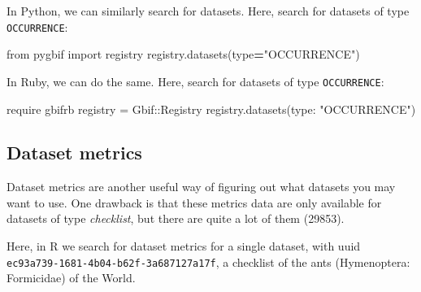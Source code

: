 \documentclass[3p]{elsarticle} %
\newenvironment{Shaded}{\begin{snugshade}}{\end{snugshade}}
\newcommand{\BuiltInTok}[1]{#1}
\newcommand{\DataTypeTok}[1]{\textcolor[rgb]{0.13,0.29,0.53}{#1}}
\newcommand{\ImportTok}[1]{#1}
\newcommand{\KeywordTok}[1]{\textcolor[rgb]{0.13,0.29,0.53}{\textbf{#1}}}
\newcommand{\NormalTok}[1]{#1}
\newcommand{\OperatorTok}[1]{\textcolor[rgb]{0.81,0.36,0.00}{\textbf{#1}}}
\newcommand{\StringTok}[1]{\textcolor[rgb]{0.31,0.60,0.02}{#1}}
\begin{document}
In Python, we can similarly search for datasets. Here, search for
datasets of type \texttt{OCCURRENCE}:

\begin{Shaded}
\begin{Highlighting}[]
\ImportTok{from}\NormalTok{ pygbif }\ImportTok{import}\NormalTok{ registry}
\NormalTok{registry.datasets(}\BuiltInTok{type}\OperatorTok{=}\StringTok{"OCCURRENCE"}\NormalTok{)}
\end{Highlighting}
\end{Shaded}

In Ruby, we can do the same. Here, search for datasets of type
\texttt{OCCURRENCE}:

\begin{Shaded}
\begin{Highlighting}[]
\NormalTok{require }\StringTok{\textquotesingle{}gbifrb\textquotesingle{}}
\NormalTok{registry = }\DataTypeTok{Gbif}\NormalTok{::}\DataTypeTok{Registry}
\NormalTok{registry.datasets(}\StringTok{type: "OCCURRENCE"}\NormalTok{)}
\end{Highlighting}
\end{Shaded}

\hypertarget{dataset-metrics}{%
\subsection{Dataset metrics}\label{dataset-metrics}}

Dataset metrics are another useful way of figuring out what datasets you
may want to use. One drawback is that these metrics data are only
available for datasets of type \emph{checklist}, but there are quite a
lot of them (29853).

Here, in R we search for dataset metrics for a single dataset, with uuid
\texttt{ec93a739-1681-4b04-b62f-3a687127a17f}, a checklist of the ants
(Hymenoptera: Formicidae) of the World.

\begin{Shaded}
\end{Shaded}
\end{document}
